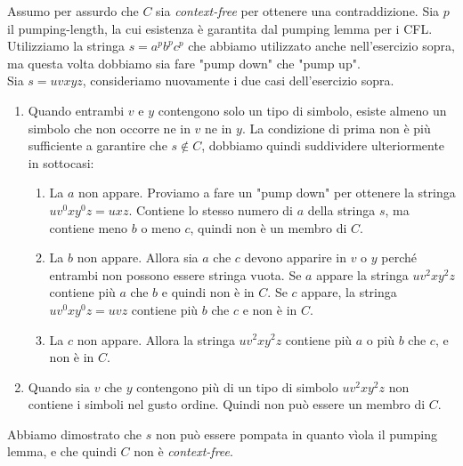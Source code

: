 \documentclass[italian]{article}
\begin{document}
	\noindent
	Assumo per assurdo che $C$ sia \textit{context-free} per ottenere una contraddizione. Sia $p$ il pumping-length, la cui esistenza è garantita dal pumping lemma per i CFL. Utilizziamo la stringa $s = a^pb^pc^p$ che abbiamo utilizzato anche nell'esercizio sopra, ma questa volta dobbiamo sia fare "pump down" che "pump up". \\
	Sia $s = uvxyz$, consideriamo nuovamente i due casi dell'esercizio sopra.
	\begin{enumerate}
		\item Quando entrambi $v$ e $y$ contengono solo un tipo di simbolo, esiste almeno un simbolo che non occorre ne in $v$ ne in $y$. La condizione di prima non è più sufficiente a garantire che $s \notin C$, dobbiamo quindi suddividere ulteriormente in sottocasi:
		\begin{enumerate}
			\item La $a$ non appare. Proviamo a fare un "pump down" per ottenere la stringa $uv^0xy^0z = uxz$. Contiene lo stesso numero di $a$ della stringa $s$, ma contiene meno $b$ o meno $c$, quindi non è un membro di $C$.
			\item  La $b$ non appare. Allora sia $a$ che $c$ devono apparire in $v$ o $y$ perché entrambi non possono essere stringa vuota. Se $a$ appare la stringa $uv^2xy^2z$ contiene più $a$ che $b$ e quindi non è in $C$. Se $c$ appare, la stringa $uv^0xy^0z = uvz$ contiene più $b$ che $c$ e non è in $C$.
			\item La $c$ non appare. Allora la stringa $uv^2xy^2z$ contiene più $a$ o più $b$ che $c$, e non è in $C$.
		\end{enumerate}
		\item Quando sia $v$ che $y$ contengono più di un tipo di simbolo  $uv^2xy^2z$ non contiene i simboli nel gusto ordine. Quindi non può essere un membro di $C$. 
	\end{enumerate}
	Abbiamo dimostrato che $s$ non può essere pompata in quanto vìola il pumping lemma, e che quindi $C$ non è \textit{context-free}.
	
\end{document}
